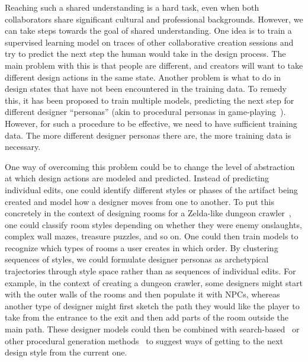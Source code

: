 Reaching such a shared understanding is a hard task, even when both collaborators share significant cultural and professional backgrounds.
However, we can take steps towards the goal of shared understanding. One idea is to train a supervised learning model on traces of other collaborative creation sessions and try to predict the next step the human would take in the design process. The main problem with this is that people are different, and creators will want to take different design actions in the same state. Another problem is what to do in design states that have not been encountered in the training data. To remedy this, it has been proposed to train multiple models, predicting the next step for different designer ``personas'' (akin to procedural personas in game-playing~). However, for such a procedure to be effective, we need to have sufficient training data. The more different designer personas there are, the more training data is necessary.

One way of overcoming this problem could be to change the level of abstraction at which design actions are modeled and predicted. Instead of predicting individual edits, one could identify different styles or phases of the artifact being created and model how a designer moves from one to another. To put this concretely in the context of designing rooms for a Zelda-like dungeon crawler~, one could classify room styles depending on whether they were enemy onslaughts, complex wall mazes, treasure puzzles, and so on. One could then train models to recognize which types of rooms a user creates in which order. By clustering sequences of styles, we could formulate designer personas as archetypical trajectories through style space rather than as sequences of individual edits. For example, in the context of creating a dungeon crawler, some designers might start with the outer walls of the rooms and then populate it with NPCs, whereas another type of designer might first sketch the path they would like the player to take from the entrance to the exit and then add parts of the room outside the main path. These designer models could then be combined with search-based~ or other procedural generation methods~ to suggest ways of getting to the next design style from the current one. 

